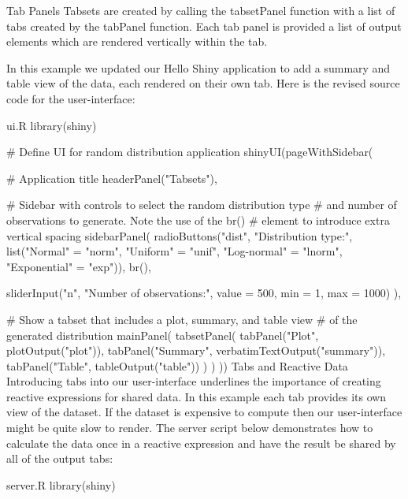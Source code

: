 Tab Panels
Tabsets are created by calling the tabsetPanel function with a list of tabs created by the tabPanel function. Each tab panel is provided a list of output elements which are rendered vertically within the tab.

In this example we updated our Hello Shiny application to add a summary and table view of the data, each rendered on their own tab. Here is the revised source code for the user-interface:

ui.R
library(shiny)

# Define UI for random distribution application 
shinyUI(pageWithSidebar(

  # Application title
  headerPanel("Tabsets"),

  # Sidebar with controls to select the random distribution type
  # and number of observations to generate. Note the use of the br()
  # element to introduce extra vertical spacing
  sidebarPanel(
    radioButtons("dist", "Distribution type:",
                 list("Normal" = "norm",
                      "Uniform" = "unif",
                      "Log-normal" = "lnorm",
                      "Exponential" = "exp")),
    br(),

    sliderInput("n", 
                "Number of observations:", 
                 value = 500,
                 min = 1, 
                 max = 1000)
  ),

  # Show a tabset that includes a plot, summary, and table view
  # of the generated distribution
  mainPanel(
    tabsetPanel(
      tabPanel("Plot", plotOutput("plot")), 
      tabPanel("Summary", verbatimTextOutput("summary")), 
      tabPanel("Table", tableOutput("table"))
    )
  )
))
Tabs and Reactive Data
Introducing tabs into our user-interface underlines the importance of creating reactive expressions for shared data. In this example each tab provides its own view of the dataset. If the dataset is expensive to compute then our user-interface might be quite slow to render. The server script below demonstrates how to calculate the data once in a reactive expression and have the result be shared by all of the output tabs:

server.R
library(shiny)

